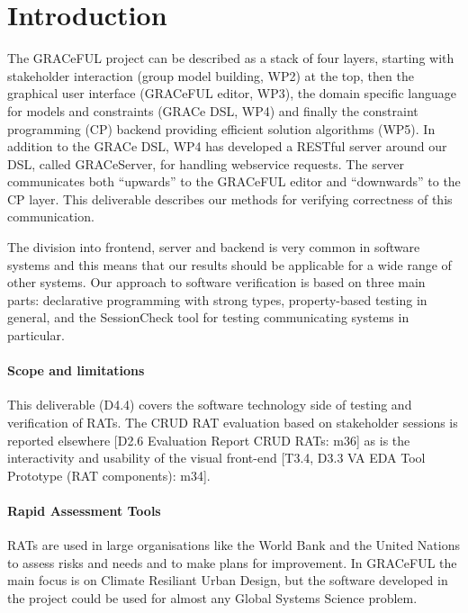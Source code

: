 \documentclass{article}
\begin{document}
\section{Introduction}
\label{sec:intro}

The GRACeFUL project can be described as a stack of four layers,
starting with stakeholder interaction (group model building, WP2) at
the top, then the graphical user interface (GRACeFUL editor, WP3), the
domain specific language for models and constraints (GRACe DSL, WP4)
and finally the constraint programming (CP) backend providing
efficient solution algorithms (WP5).
%
In addition to the GRACe DSL, WP4 has developed a RESTful server around our DSL,
called GRACeServer, for handling webservice requests. The server communicates
both ``upwards'' to the GRACeFUL editor and ``downwards'' to the CP layer.
%
This deliverable describes our methods for verifying correctness of
this communication.

The division into frontend, server and backend is very common in
software systems and this means that our results should be applicable
for a wide range of other systems.
%
Our approach to software verification is based on three main parts:
%
declarative programming with strong types, property-based testing in
general, and the SessionCheck tool for testing communicating systems
in particular.

\paragraph{Scope and limitations}

This deliverable (D4.4) covers the software technology side of testing
and verification of RATs.
%
The CRUD RAT evaluation based on stakeholder sessions is reported
elsewhere [D2.6 Evaluation Report CRUD RATs: m36] as is the
interactivity and usability of the visual front-end [T3.4, D3.3 VA EDA
Tool Prototype (RAT components): m34].

\paragraph{Rapid Assessment Tools}

RATs are used in large organisations like the World Bank and the
United Nations to assess risks and needs and to make plans for
improvement.
In GRACeFUL the main focus is on Climate Resiliant Urban Design, but
the software developed in the project could be used for almost any
Global Systems Science problem.
\end{document}
